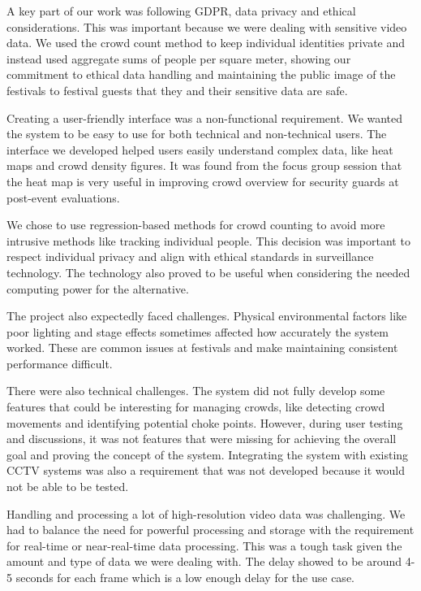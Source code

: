 \documentclass[
]{article}
\begin{document}
A key part of our work was following GDPR, data privacy and ethical
considerations. This was important because we were dealing with
sensitive video data. We used the crowd count method to keep individual
identities private and instead used aggregate sums of people per square
meter, showing our commitment to ethical data handling and maintaining
the public image of the festivals to festival guests that they and their
sensitive data are safe.

Creating a user-friendly interface was a non-functional requirement. We
wanted the system to be easy to use for both technical and non-technical
users. The interface we developed helped users easily understand complex
data, like heat maps and crowd density figures. It was found from the
focus group session that the heat map is very useful in improving crowd
overview for security guards at post-event evaluations.

We chose to use regression-based methods for crowd counting to avoid
more intrusive methods like tracking individual people. This decision
was important to respect individual privacy and align with ethical
standards in surveillance technology. The technology also proved to be
useful when considering the needed computing power for the alternative.

The project also expectedly faced challenges. Physical environmental
factors like poor lighting and stage effects sometimes affected how
accurately the system worked. These are common issues at festivals and
make maintaining consistent performance difficult.

There were also technical challenges. The system did not fully develop
some features that could be interesting for managing crowds, like
detecting crowd movements and identifying potential choke points.
However, during user testing and discussions, it was not features that
were missing for achieving the overall goal and proving the concept of
the system. Integrating the system with existing CCTV systems was also a
requirement that was not developed because it would not be able to be
tested.

Handling and processing a lot of high-resolution video data was
challenging. We had to balance the need for powerful processing and
storage with the requirement for real-time or near-real-time data
processing. This was a tough task given the amount and type of data we
were dealing with. The delay showed to be around 4-5 seconds for each
frame which is a low enough delay for the use case.
\end{document}
